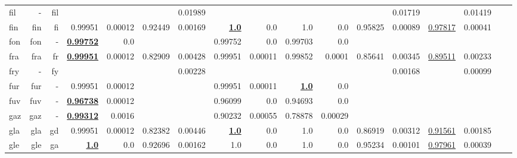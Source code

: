 \documentclass[11pt]{article}
\begin{document}
\begin{table*}[h]
{\begin{tabular}{lrrrrrrrrrrrrrrrr}
fil         & -         & fil         &          &          &          & 0.01989         &          &          &          &          &          & 0.01719         &          & 0.01419         \\
fin         & fin         & fi         & 0.99951         & 0.00012         & 0.92449         & 0.00169         & \textbf{\underline{1.0}}         & 0.0         & 1.0         & 0.0         & 0.95825         & 0.00089         & \underline{0.97817}         & 0.00041         \\
fon         & fon         & -         & \textbf{\underline{0.99752}}         & 0.0         &          &          & 0.99752         & 0.0         & 0.99703         & 0.0         &          &          &          &          \\
fra         & fra         & fr         & \textbf{\underline{0.99951}}         & 0.00012         & 0.82909         & 0.00428         & 0.99951         & 0.00011         & 0.99852         & 0.0001         & 0.85641         & 0.00345         & \underline{0.89511}         & 0.00233         \\
fry         & -         & fy         &          &          &          & 0.00228         &          &          &          &          &          & 0.00168         &          & 0.00099         \\
fur         & fur         & -         & 0.99951         & 0.00012         &          &          & 0.99951         & 0.00011         & \textbf{\underline{1.0}}         & 0.0         &          &          &          &          \\
fuv         & fuv         & -         & \textbf{\underline{0.96738}}         & 0.00012         &          &          & 0.96099         & 0.0         & 0.94693         & 0.0         &          &          &          &          \\
gaz         & gaz         & -         & \textbf{\underline{0.99312}}         & 0.0016         &          &          & 0.90232         & 0.00055         & 0.78878         & 0.00029         &          &          &          &          \\
gla         & gla         & gd         & 0.99951         & 0.00012         & 0.82382         & 0.00446         & \textbf{\underline{1.0}}         & 0.0         & 1.0         & 0.0         & 0.86919         & 0.00312         & \underline{0.91561}         & 0.00185         \\
gle         & gle         & ga         & \textbf{\underline{1.0}}         & 0.0         & 0.92696         & 0.00162         & 1.0         & 0.0         & 1.0         & 0.0         & 0.95234         & 0.00101         & \underline{0.97961}         & 0.00039         \\

\end{tabular}}
\end{table*}
\end{document}
